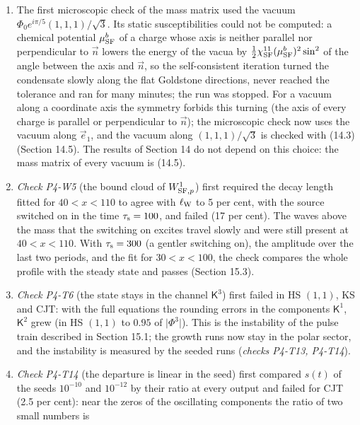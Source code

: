 \documentclass[
  10pt,
]{article}
\providecommand{\tightlist}{%
  \setlength{\itemsep}{0pt}\setlength{\parskip}{0pt}}
\begin{document}
\begin{enumerate}
\def\labelenumi{\arabic{enumi}.}
\tightlist
\item
  The first microscopic check of the mass matrix used the vacuum
  \(\Phi_0e^{i\pi/5}(1,1,1)/\sqrt3\). Its static susceptibilities could
  not be computed: a chemical potential \(\mu^b_{\rm SF}\) of a charge
  whose axis is neither parallel nor perpendicular to \(\vec n\) lowers
  the energy of the vacua by
  \(\tfrac12\chi^{11}_{\rm SF}(\mu^b_{\rm SF})^2\sin^2\) of the angle
  between the axis and \(\vec n\), so the self-consistent iteration
  turned the condensate slowly along the flat Goldstone directions,
  never reached the tolerance and ran for many minutes; the run was
  stopped. For a vacuum along a coordinate axis the symmetry forbids
  this turning (the axis of every charge is parallel or perpendicular to
  \(\vec n\)); the microscopic check now uses the vacuum along
  \(\vec e_1\), and the vacuum along \((1,1,1)/\sqrt3\) is checked with
  (14.3) (Section 14.5). The results of Section 14 do not depend on this
  choice: the mass matrix of every vacuum is (14.5).
\item
  \emph{Check P4-W5} (the bound cloud of \(W^1_{{\rm SF},p}\)) first
  required the decay length fitted for \(40<x<110\) to agree with
  \(\ell_{\rm W}\) to 5 per cent, with the source switched on in the
  time \(\tau_{\rm s}=100\), and failed (17 per cent). The waves above
  the mass that the switching on excites travel slowly and were still
  present at \(40<x<110\). With \(\tau_{\rm s}=300\) (a gentler
  switching on), the amplitude over the last two periods, and the fit
  for \(30<x<100\), the check compares the whole profile with the steady
  state and passes (Section 15.3).
\item
  \emph{Check P4-T6} (the state stays in the channel \(\mathsf K^3\))
  first failed in HS \((1,1)\), KS and CJT: with the full equations the
  rounding errors in the components \(\mathsf K^1\), \(\mathsf K^2\)
  grew (in HS \((1,1)\) to \(0.95\) of \(\lvert\Phi^3\rvert\)). This is
  the instability of the pulse train described in Section 15.1; the
  growth runs now stay in the polar sector, and the instability is
  measured by the seeded runs (\emph{checks P4-T13, P4-T14}).
\item
  \emph{Check P4-T14} (the departure is linear in the seed) first
  compared \(s(t)\) of the seeds \(10^{-10}\) and \(10^{-12}\) by their
  ratio at every output and failed for CJT (2.5 per cent): near the
  zeros of the oscillating components the ratio of two small numbers is

\end{enumerate}
\end{document}
